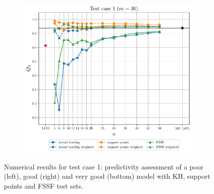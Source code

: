 \begin{figure}
\begin{subfigure}[b]{0.49\linewidth}
  \end{subfigure}
  \\
  \centering
  \begin{subfigure}[b]{0.49\linewidth}
    \centering
    \includegraphics[width=\linewidth]{./part2/figures/SIS/irregular_learnsize_30.pdf}
  \end{subfigure}
  \caption{Numerical results for test case 1: predictivity assessment of a poor (left), good (right) and very good (bottom) model with KH, support points and FSSF test sets.}
  \label{fig:irregular_benchmark}
\end{figure}



